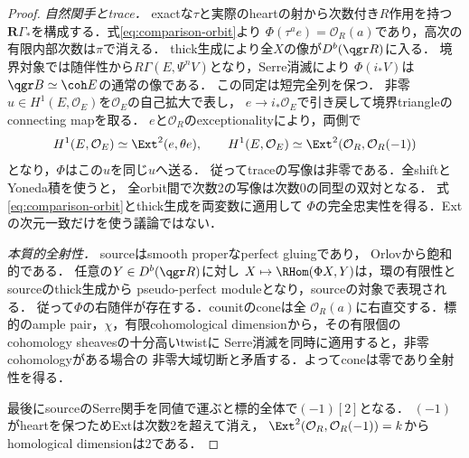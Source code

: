 \begin{proof}
\emph{自然関手とtrace．}
exactな$\tau$と実際のheartの射から次数付き$R$作用を持つ
$\mathbf R\Gamma_*$を構成する．式\eqref{eq:comparison-orbit}より
$\Phi(\tau^ae)=\mathcal O_R(a)$であり，高次の有限内部次数は$\pi$で消える．
thick生成により全$X$の像が$D^b(\qgr R)$に入る．
境界対象では随伴性から$R\Gamma(E,\Psi^nV)$となり，Serre消滅により
$\Phi(i_*V)$は$\qgr B\simeq\coh E$の通常の像である．
この同定は短完全列を保つ．
非零$u\in H^1(E,\mathcal O_E)$を$\mathcal O_E$の自己拡大で表し，
$e\to i_*\mathcal O_E$で引き戻して境界triangleのconnecting mapを取る．
$e$と$\mathcal O_R$のexceptionalityにより，両側で
\[
H^1(E,\mathcal O_E)\simeq\Ext^2(e,\theta e),\qquad
H^1(E,\mathcal O_E)\simeq\Ext^2(\mathcal O_R,\mathcal O_R(-1))
\]
となり，$\Phi$はこの$u$を同じ$u$へ送る．
従ってtraceの写像は非零である．全shiftとYoneda積を使うと，
全orbit間で次数2の写像は次数0の同型の双対となる．
式\eqref{eq:comparison-orbit}とthick生成を両変数に適用して
$\Phi$の完全忠実性を得る．Extの次元一致だけを使う議論ではない．

\emph{本質的全射性．}
sourceはsmooth properなperfect gluingであり，
Orlov\cite[Theorems 3.18, 3.25, Corollary 3.19]{OrlovResonance}から飽和的である．
任意の$Y\in D^b(\qgr R)$に対し
$X\mapsto\RHom(\Phi X,Y)$は，環の有限性とsourceのthick生成から
pseudo-perfect moduleとなり，sourceの対象で表現される．
従って$\Phi$の右随伴が存在する．counitのconeは全
$\mathcal O_R(a)$に右直交する．標的のample pair，$\chi$，有限cohomological
 dimensionから，その有限個のcohomology sheavesの十分高いtwistに
Serre消滅を同時に適用すると，非零cohomologyがある場合の
非零大域切断と矛盾する．よってconeは零であり全射性を得る．

最後にsourceのSerre関手を同値で運ぶと標的全体で$(-1)[2]$となる．
$(-1)$がheartを保つためExtは次数2を超えて消え，
$\Ext^2(\mathcal O_R,\mathcal O_R(-1))=k$からhomological dimensionは2である．
\end{proof}

